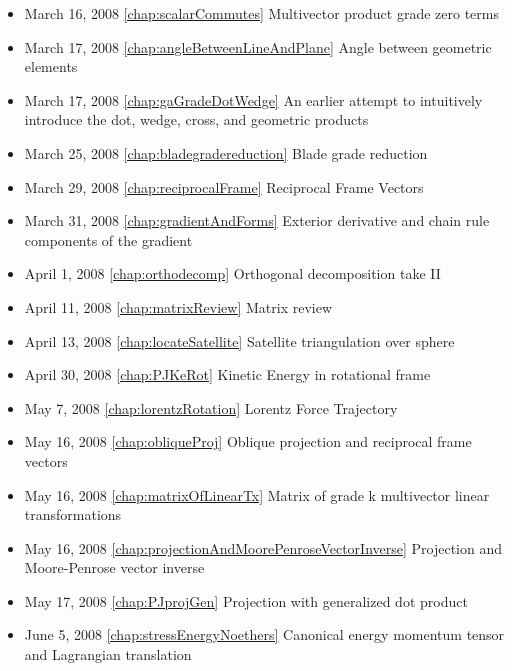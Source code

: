 \begin{itemize}
\item March 16, 2008 \ref{chap:scalarCommutes} Multivector product grade zero terms

\item March 17, 2008 \ref{chap:angleBetweenLineAndPlane} Angle between geometric elements

\item March 17, 2008 \ref{chap:gaGradeDotWedge} An earlier attempt to intuitively introduce the dot, wedge, cross, and geometric products

\item March 25, 2008 \ref{chap:bladegradereduction} Blade grade reduction

\item March 29, 2008 \ref{chap:reciprocalFrame} Reciprocal Frame Vectors

\item March 31, 2008 \ref{chap:gradientAndForms} Exterior derivative and chain rule components of the gradient

\item April 1, 2008 \ref{chap:orthodecomp} Orthogonal decomposition take II

\item April 11, 2008 \ref{chap:matrixReview} Matrix review

\item April 13, 2008 \ref{chap:locateSatellite} Satellite triangulation over sphere

\item April 30, 2008 \ref{chap:PJKeRot} Kinetic Energy in rotational frame

\item May 7, 2008 \ref{chap:lorentzRotation} Lorentz Force Trajectory

\item May 16, 2008 \ref{chap:obliqueProj} Oblique projection and reciprocal frame vectors

\item May 16, 2008 \ref{chap:matrixOfLinearTx} Matrix of grade k multivector linear transformations

\item May 16, 2008 \ref{chap:projectionAndMoorePenroseVectorInverse} Projection and Moore-Penrose vector inverse

\item May 17, 2008 \ref{chap:PJprojGen} Projection with generalized dot product

\item June 5, 2008 \ref{chap:stressEnergyNoethers} Canonical energy momentum tensor and Lagrangian translation


\end{itemize}
